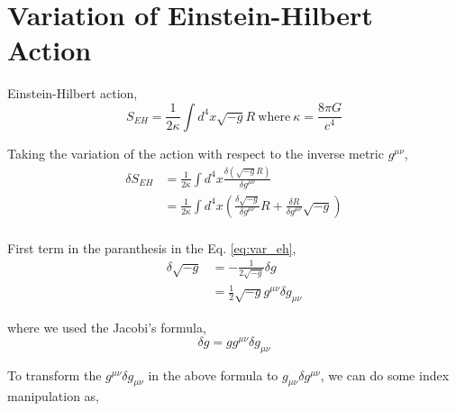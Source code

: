 \section{Variation of Einstein-Hilbert Action \label{sec:variation_of_eh_action}}

Einstein-Hilbert action,
\begin{equation}
S_{EH} = \frac{1}{2\kappa}\int d^{4}x\sqrt{-g}R\ \text{where}\ \kappa = \frac{8\pi G}{c^{4}}
\end{equation}

Taking the variation of the action with respect to the inverse metric $g^{\mu\nu}$,
\begin{equation}
\label{eq:var_eh}
\begin{split}
\delta S_{EH} &= \frac{1}{2\kappa}\int d^{4}x \frac{\delta\left(\sqrt{-g}R\right)}{\delta g^{\mu\nu}}\\
&= \frac{1}{2\kappa} \int d^{4}x \left(\frac{\delta\sqrt{-g}}{\delta g^{\mu\nu}}R + \frac{\delta R}{\delta g^{\mu\nu}}\sqrt{-g}\right)\\
\end{split}
\end{equation}

First term in the paranthesis in the Eq. \ref{eq:var_eh},
\begin{equation}
\label{eq:var_of_mdet}
\begin{split}
\delta\sqrt{-g} &= -\frac{1}{2\sqrt{-g}}\delta g\\
&= \frac{1}{2}\sqrt{-g}g^{\mu\nu}\delta g_{\mu\nu}
\end{split}
\end{equation}

where we used the Jacobi's formula,
\begin{equation}
\label{eq:jacobi_formula}
\delta g = g g^{\mu\nu}\delta g_{\mu\nu}
\end{equation}

To transform the $g^{\mu\nu}\delta g_{\mu\nu}$ in the above formula to $g_{\mu\nu}\delta g^{\mu\nu}$, we can do some index manipulation as,

